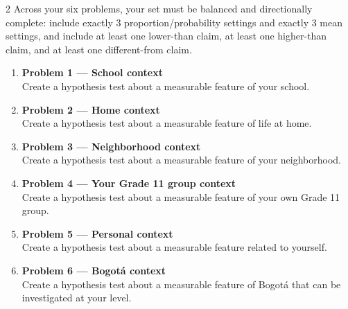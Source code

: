 \documentclass[12pt]{article}
\begin{document}
\begin{multicols}{2}
Across your six problems, your set must be balanced and directionally complete: include exactly 3 proportion/probability settings and exactly 3 mean settings, and include at least one lower-than claim, at least one higher-than claim, and at least one different-from claim.



\begin{enumerate}
\item \textbf{Problem 1 --- School context}\\
Create a hypothesis test about a measurable feature of your school.

\item \textbf{Problem 2 --- Home context}\\
Create a hypothesis test about a measurable feature of life at home.

\item \textbf{Problem 3 --- Neighborhood context}\\
Create a hypothesis test about a measurable feature of your neighborhood.

\item \textbf{Problem 4 --- Your Grade 11 group context}\\
Create a hypothesis test about a measurable feature of your own Grade 11 group.

\item \textbf{Problem 5 --- Personal context}\\
Create a hypothesis test about a measurable feature related to yourself.

\item \textbf{Problem 6 --- Bogotá context}\\
Create a hypothesis test about a measurable feature of Bogotá that can be investigated at your level.
\end{enumerate}

\end{multicols}
\end{document}
